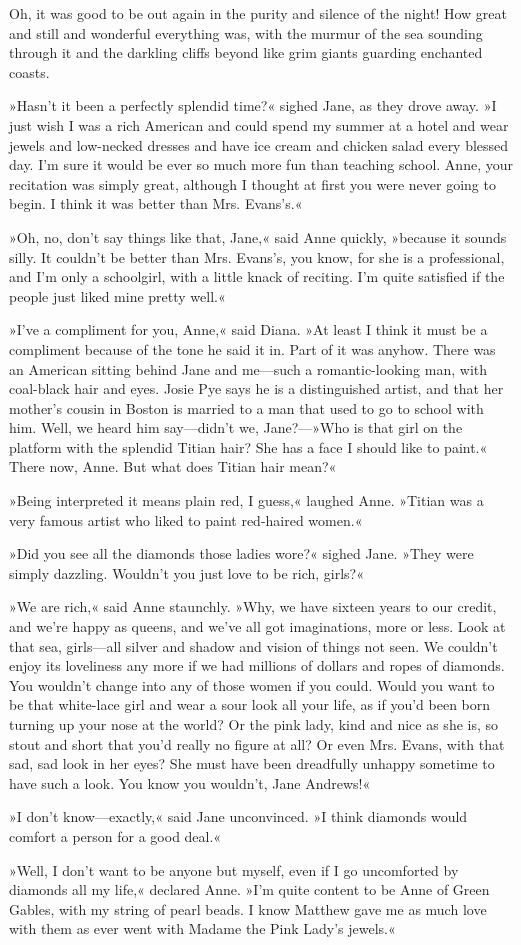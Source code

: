Oh, it was good to be out again in the purity and silence of the night! How great and still and wonderful everything was, with the murmur of the sea sounding through it and the darkling cliffs beyond like grim giants guarding enchanted coasts.

»Hasn't it been a perfectly splendid time?« sighed Jane, as they drove away. »I just wish I was a rich American and could spend my summer at a hotel and wear jewels and low-necked dresses and have ice cream and chicken salad every blessed day. I'm sure it would be ever so much more fun than teaching school. Anne, your recitation was simply great, although I thought at first you were never going to begin. I think it was better than Mrs. Evans's.«

»Oh, no, don't say things like that, Jane,« said Anne quickly, »because it sounds silly. It couldn't be better than Mrs. Evans's, you know, for she is a professional, and I'm only a schoolgirl, with a little knack of reciting. I'm quite satisfied if the people just liked mine pretty well.«

»I've a compliment for you, Anne,« said Diana. »At least I think it must be a compliment because of the tone he said it in. Part of it was anyhow. There was an American sitting behind Jane and me—such a romantic-looking man, with coal-black hair and eyes. Josie Pye says he is a distinguished artist, and that her mother's cousin in Boston is married to a man that used to go to school with him. Well, we heard him say—didn't we, Jane?—»Who is that girl on the platform with the splendid Titian hair? She has a face I should like to paint.« There now, Anne. But what does Titian hair mean?«

»Being interpreted it means plain red, I guess,« laughed Anne. »Titian was a very famous artist who liked to paint red-haired women.«

»Did you see all the diamonds those ladies wore?« sighed Jane. »They were simply dazzling. Wouldn't you just love to be rich, girls?«

»We are rich,« said Anne staunchly. »Why, we have sixteen years to our credit, and we're happy as queens, and we've all got imaginations, more or less. Look at that sea, girls—all silver and shadow and vision of things not seen. We couldn't enjoy its loveliness any more if we had millions of dollars and ropes of diamonds. You wouldn't change into any of those women if you could. Would you want to be that white-lace girl and wear a sour look all your life, as if you'd been born turning up your nose at the world? Or the pink lady, kind and nice as she is, so stout and short that you'd really no figure at all? Or even Mrs. Evans, with that sad, sad look in her eyes? She must have been dreadfully unhappy sometime to have such a look. You know you wouldn't, Jane Andrews!«

»I don't know—exactly,« said Jane unconvinced. »I think diamonds would comfort a person for a good deal.«

»Well, I don't want to be anyone but myself, even if I go uncomforted by diamonds all my life,« declared Anne. »I'm quite content to be Anne of Green Gables, with my string of pearl beads. I know Matthew gave me as much love with them as ever went with Madame the Pink Lady's jewels.«
